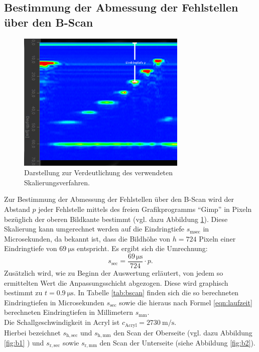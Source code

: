 \subsection{Bestimmung der Abmessung der Fehlstellen über den B-Scan}
\label{sec:bscan}
\begin{figure}
  \centering
  \includegraphics[width=0.72\textwidth]{bscan/messverfahren}
  \caption{Darstellung zur Verdeutlichung des verwendeten Skalierungsverfahren.}
  \label{fig:messverfahren}
\end{figure}
Zur Bestimmung der Abmessung der Fehlstellen über den B-Scan wird der Abstand $p$ jeder Fehlstelle mittels des freien Grafikprogramms \enquote{Gimp} in Pixeln bezüglich der oberen Bildkante bestimmt (vgl. dazu Abbildung \ref{fig:messverfahren}).
Diese Skalierung kann umgerechnet werden auf die Eindringtiefe $s_\mathrm{msec}$ in Microsekunden, da bekannt ist, dass die Bildhöhe von $h=\num{724}$ Pixeln einer Eindringtiefe von $\SI{69}{\micro\second}$ entspricht.
Es ergibt sich die Umrechnung:
\begin{equation}
  s_\mathrm{sec}=\frac{69\, \si{\micro\second}}{724}\cdot p \text{.}
\end{equation}
Zusätzlich wird, wie zu Beginn der Auswertung erläutert, von jedem so ermittelten Wert die Anpassungsschicht abgezogen. Diese wird graphisch bestimmt zu $t=\SI{0.9}{\micro\second}$.
In Tabelle \ref{tab:bscan} finden sich die so berechneten Eindringtiefen in Microsekunden $s_\mathrm{sec}$ sowie die hieraus nach Formel \eqref{eqn:laufzeit} berechneten Eindringtiefen in Millimetern $s_\mathrm{mm}$.\\
Die Schallgeschwindigkeit in Acryl ist $c_\mathrm{Acryl}=\SI{2730}{\meter\per\second}$.\\
Hierbei bezeichnet $s_\mathrm{h,sec}$ und $s_\mathrm{h,mm}$ den Scan der Oberseite (vgl. dazu Abbildung \ref{fig:b1} ) und $s_\mathrm{r,sec}$ sowie $s_\mathrm{r,mm}$ den Scan der Unterseite (siehe Abbildung \ref{fig:b2}).
